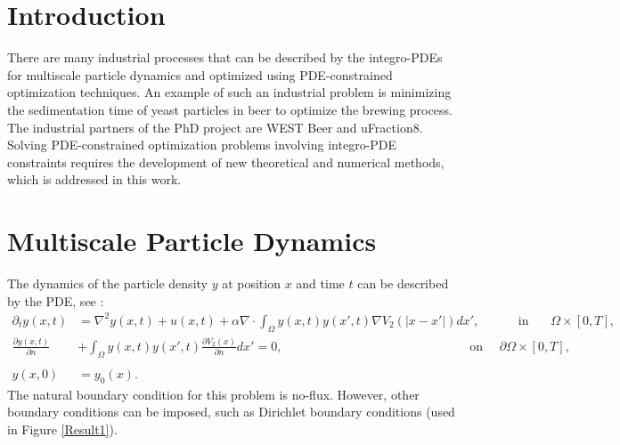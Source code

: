 \documentclass[a0,portrait]{a0poster}
\newcommand{\Sta}{y}
\begin{document}
\vspace{1cm} %


\begin{multicols}{2} %







\section*{Introduction}
There are many industrial processes that can be described by the integro-PDEs for multiscale particle dynamics and optimized using PDE-constrained optimization techniques. An example of such an industrial problem is minimizing the sedimentation time of yeast particles in beer to optimize the brewing process. The industrial partners of the PhD project are WEST Beer and uFraction8. Solving PDE-constrained optimization problems involving integro-PDE constraints requires the development of new theoretical and numerical methods, which is addressed in this work. 

\section*{Multiscale Particle Dynamics}
The dynamics of the particle density $\Sta$ at position $x$ and time $t$ can be described by the PDE, see \cite{RexLoewen1}:
\begin{align*}
\partial_t \Sta(x,t) &=\nabla^2 \Sta(x,t) +u (x,t)+\alpha \nabla \cdot\int_\Omega \Sta(x,t) \Sta(x',t) \nabla V_2(|x-x'|)dx',\qquad \ \ \ \ \ \text{in   } \ \ \quad \Omega \times [0,T],\\
\frac{\partial \Sta(x,t)}{\partial n} &+\int_\Omega \Sta(x,t) \Sta(x',t) \frac{\partial V_2(x)}{\partial n}dx'=0, \quad \qquad\qquad\qquad\qquad\qquad\qquad\qquad  \text{on   } \quad \partial \Omega \times [0,T],\\
\\
\Sta(x,0) &=\Sta_0(x).
\end{align*}
 The natural boundary condition for this problem is no-flux. However, other boundary conditions can be imposed, such as Dirichlet boundary conditions (used in Figure \ref{Result1}).


\end{multicols}
\end{document}
